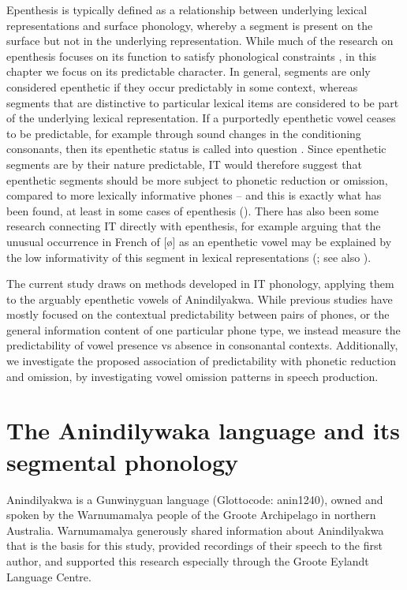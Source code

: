 \documentclass[output=paper,colorlinks,citecolor=brown]{langscibook}
\begin{document}
Epenthesis is typically defined as a relationship between underlying lexical representations and surface phonology, whereby a segment is present on the surface but not in the underlying representation. While much of the research on epenthesis focuses on its function to satisfy phonological constraints \citep{Hall2011}, in this chapter we focus on its predictable character. In general, segments are only considered epenthetic if they occur predictably in some context, whereas segments that are distinctive to particular lexical items are considered to be part of the underlying lexical representation. If a purportedly epenthetic vowel ceases to be predictable, for example through sound changes in the conditioning consonants, then its epenthetic status is called into question \citep[1579]{Hall2011}. Since epenthetic segments are by their nature predictable, IT would therefore suggest that epenthetic segments should be more subject to phonetic reduction or omission, compared to more lexically informative phones – and this is exactly what has been found, at least in some cases of epenthesis (\citealt{HallN2013}). There has also been some research connecting IT directly with epenthesis, for example arguing that the unusual occurrence in French of [ø] as an epenthetic vowel may be explained by the low informativity of this segment in lexical representations (\citealt {hume_anti-markedness_2011}; see also \citealt{tily_rational_2012}).

The current study draws on methods developed in IT phonology, applying them to the arguably epenthetic vowels of Anindilyakwa. While previous studies have mostly focused on the contextual predictability between pairs of phones, or the general information content of one particular phone type, we instead measure the predictability of vowel presence vs absence in consonantal contexts. Additionally, we investigate the proposed association of predictability with phonetic reduction and omission, by investigating vowel omission patterns in speech production.


\section{The Anindilywaka language and its segmental phonology}\label{sec:mansfield:3}

Anindilyakwa is a Gunwinyguan language (Glottocode: anin1240), owned and spoken by the Warnumamalya people of the Groote Archipelago in northern Australia. Warnumamalya generously shared information about Anindilyakwa that is the basis for this study, provided recordings of their speech to the first author, and supported this research especially through the Groote Eylandt Language Centre.
\end{document}
